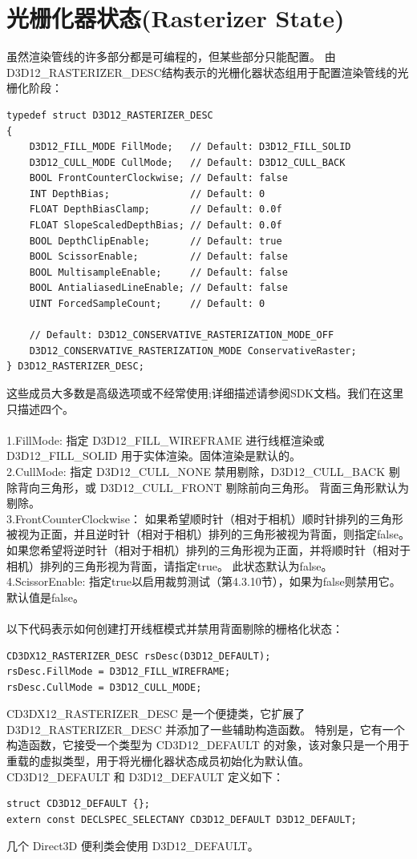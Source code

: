 \documentclass[11pt,a4paper,oldfontcommands]{memoir}
\begin{document}
{\section{光栅化器状态(Rasterizer State)}
\begin{flushleft}
虽然渲染管线的许多部分都是可编程的，但某些部分只能配置。 由D3D12\_RASTERIZER\_DESC结构表示的光栅化器状态组用于配置渲染管线的光栅化阶段：\\
\begin{lstlisting}
typedef struct D3D12_RASTERIZER_DESC
{
    D3D12_FILL_MODE FillMode;   // Default: D3D12_FILL_SOLID
    D3D12_CULL_MODE CullMode;   // Default: D3D12_CULL_BACK
    BOOL FrontCounterClockwise; // Default: false
    INT DepthBias;              // Default: 0
    FLOAT DepthBiasClamp;       // Default: 0.0f
    FLOAT SlopeScaledDepthBias; // Default: 0.0f
    BOOL DepthClipEnable;       // Default: true
    BOOL ScissorEnable;         // Default: false
    BOOL MultisampleEnable;     // Default: false
    BOOL AntialiasedLineEnable; // Default: false
    UINT ForcedSampleCount;     // Default: 0

    // Default: D3D12_CONSERVATIVE_RASTERIZATION_MODE_OFF
    D3D12_CONSERVATIVE_RASTERIZATION_MODE ConservativeRaster;
} D3D12_RASTERIZER_DESC;
\end{lstlisting}
这些成员大多数是高级选项或不经常使用;详细描述请参阅SDK文档。我们在这里只描述四个。\\
~\\
1.FillMode: 指定 D3D12\_FILL\_WIREFRAME 进行线框渲染或 D3D12\_FILL\_SOLID 用于实体渲染。固体渲染是默认的。\\
2.CullMode: 指定 D3D12\_CULL\_NONE 禁用剔除，D3D12\_CULL\_BACK 剔除背向三角形，或 D3D12\_CULL\_FRONT 剔除前向三角形。 背面三角形默认为剔除。\\
3.FrontCounterClockwise： 如果希望顺时针（相对于相机）顺时针排列的三角形被视为正面，并且逆时针（相对于相机）排列的三角形被视为背面，则指定false。 如果您希望将逆时针（相对于相机）排列的三角形视为正面，并将顺时针（相对于相机）排列的三角形视为背面，请指定true。 此状态默认为false。\\
4.ScissorEnable: 指定true以启用裁剪测试（第4.3.10节），如果为false则禁用它。 默认值是false。\\
~\\
以下代码表示如何创建打开线框模式并禁用背面剔除的栅格化状态：\\
\begin{lstlisting}
CD3DX12_RASTERIZER_DESC rsDesc(D3D12_DEFAULT);
rsDesc.FillMode = D3D12_FILL_WIREFRAME;
rsDesc.CullMode = D3D12_CULL_MODE;
\end{lstlisting}
CD3DX12\_RASTERIZER\_DESC 是一个便捷类，它扩展了 D3D12\_RASTERIZER\_DESC 并添加了一些辅助构造函数。 特别是，它有一个构造函数，它接受一个类型为 CD3D12\_DEFAULT 的对象，该对象只是一个用于重载的虚拟类型，用于将光栅化器状态成员初始化为默认值。CD3D12\_DEFAULT 和 D3D12\_DEFAULT 定义如下：\\
\begin{lstlisting}
struct CD3D12_DEFAULT {};
extern const DECLSPEC_SELECTANY CD3D12_DEFAULT D3D12_DEFAULT;
\end{lstlisting}
几个 Direct3D 便利类会使用 D3D12\_DEFAULT。
\end{flushleft}

}
\end{document}
